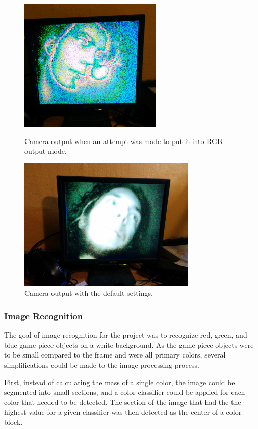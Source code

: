 \documentclass{article}
\begin{document}
\begin{figure}[H]
\centering
\begin{minipage}{.5\textwidth}
  \captionsetup{width=0.8\textwidth}
  \centering
  \includegraphics[height=2.5in]{weston}
  \caption{Camera output when an attempt was made to put it into RGB output mode.}
\end{minipage}%
\begin{minipage}{.5\textwidth}
  \captionsetup{width=0.8\textwidth}
  \centering
  \includegraphics[height=2.5in]{peter}
  \caption{Camera output with the default settings.}
\end{minipage}
\end{figure}
	
\subsubsection{Image Recognition} \label{imagerec}

The goal of image recognition for the project was to recognize red, green, and blue game piece objects on a white background. As the game piece objects were to be small compared to the frame and were all primary colors, several simplifications could be made to the image processing process.

First, instead of calculating the mass of a single color, the image could be segmented into small sections, and a color classifier could be applied for each color that needed to be detected. The section of the image that had the the highest value for a given classifier was then detected as the center of a color block. 
\end{document}
